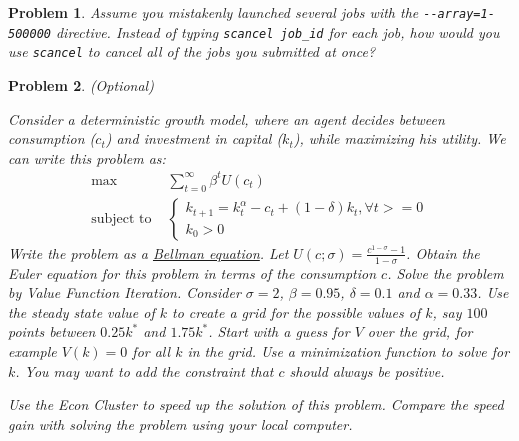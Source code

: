 \documentclass[12pt, a4paper]{article}
\newtheorem{problem}{Problem}
\begin{document}
\begin{problem}
Assume you mistakenly launched several jobs with the \texttt{-{}-array=1-500000} directive. Instead of typing \texttt{scancel job\_id} for each job, how would you use \texttt{scancel} to cancel all of the jobs you submitted at once?
\end{problem}

\begin{problem}
(Optional)

Consider a deterministic growth model, where an agent decides between consumption (\(c_t\)) and investment in capital (\(k_t\)), while maximizing his utility.
We can write this problem as:
\begin{align*}
  \max&\sum_{t=0}^{\infty}\beta^tU(c_t)\\
  \text{subject to }&
                      \begin{cases}
                        k_{t+1} = k_t^{\alpha} - c_t + (1-\delta)k_t, \forall t >= 0\\
                        k_0 > 0
                      \end{cases}
\end{align*}
Write the problem as a \href{https://en.wikipedia.org/wiki/Bellman\_equation}{Bellman equation}.
Let \(U(c; \sigma)=\frac{c^{1-\sigma}-1}{1-\sigma}\).
Obtain the Euler equation for this problem in terms of the consumption \(c\).
Solve the problem by Value Function Iteration.
Consider \(\sigma=2\), \(\beta=0.95\), \(\delta=0.1\) and \(\alpha=0.33\).
Use the steady state value of \(k\) to create a grid for the possible values of \(k\), say \(100\) points between \(0.25 k^*\) and \(1.75 k^*\).
Start with a guess for \(V\) over the grid, for example \(V(k)=0\) for all \(k\) in the grid.
Use a minimization function to solve for \(k\).
You may want to add the constraint that \(c\) should always be positive.

Use the Econ Cluster to speed up the solution of this problem.
Compare the speed gain with solving the problem using your local computer.
\end{problem}
\end{document}
